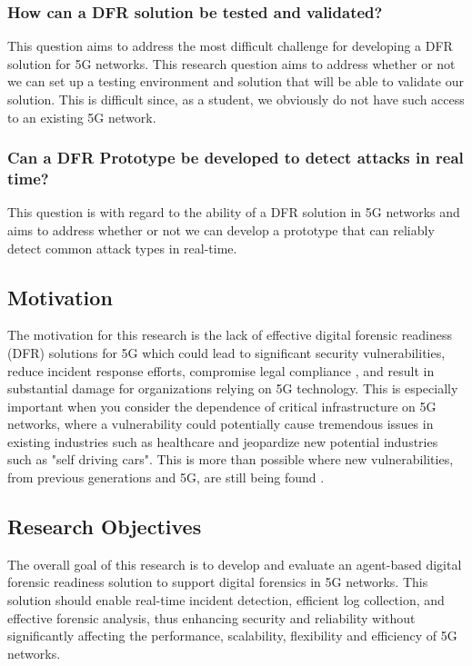 \documentclass[final,1p,times,authoryear]{elsarticle}
\begin{document}
\subsubsection{How can a DFR solution be tested and validated?}
\label{sub1sub2sec3}
This question aims to address the most difficult challenge for developing a DFR solution for 5G networks. This research question aims to address whether or not we can set up a testing environment and solution that will be able to validate our solution. This is difficult since, as a student, we obviously do not have such access to an existing 5G network.

\subsubsection{Can a DFR Prototype be developed to detect attacks in real time?}
\label{sub1sub2sec4}
This question is with regard to the ability of a DFR solution in 5G networks and aims to address whether or not we can develop a prototype that can reliably detect common attack types in real-time. 

\subsection{Motivation}
\label{sub1sec3}
The motivation for this research is the lack of effective digital forensic readiness (DFR) solutions for 5G which could lead to significant security vulnerabilities, reduce incident response efforts, compromise legal compliance \citep{elyas2015digital}, and result in substantial damage for organizations relying on 5G technology. This is especially important when you consider the dependence of critical infrastructure on 5G networks, \citep{dangi2021study} where a vulnerability could potentially cause tremendous issues in existing industries such as healthcare and jeopardize new potential industries such as "self driving cars". This is more than possible where new vulnerabilities, from previous generations and 5G, are still being found \citep{10.1145/3317549.3319728}.

\subsection{Research Objectives}
\label{sub1sec4}
The overall goal of this research is to develop and evaluate an agent-based digital forensic readiness solution to support digital forensics in 5G networks. This solution should enable real-time incident detection, efficient log collection, and effective forensic analysis, thus enhancing security and reliability without significantly affecting the performance, scalability, flexibility and efficiency of 5G networks.
\end{document}
